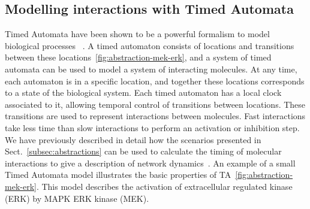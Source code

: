 \subsection{Modelling interactions with Timed Automata}\label{subsec:timed-automata}
\def\ta{TA}
\def\tas{TA}

Timed Automata have been shown to be a powerful formalism to model biological processes
~\citep{ta-siebert,bartocci-oscillators,oded-ode-ta-discretization}. A timed automaton consists of locations
and transitions between these locations~\ref{fig:abstraction-mek-erk}, and a system of timed automata can be 
used to model a system of interacting molecules. At any time, each automaton is in a specific location, and together 
these locations corresponds to a state of the biological system. Each timed automaton has a local clock 
associated to it, allowing temporal control of transitions between locations. These transitions are used to 
represent interactions between molecules. Fast interactions take less time than slow interactions 
to perform an activation or inhibition step. We have previously described in detail how the 
scenarios presented in Sect.~\ref{subsec:abstractions} can be used to calculate the timing of molecular 
interactions to give a description of network dynamics~\citep{animo-bibe}. An example of a small Timed Automata model 
illustrates the basic properties of \tas~\ref{fig:abstraction-mek-erk}. 
This model describes the activation of extracellular regulated kinase (ERK) by MAPK ERK kinase (MEK).

